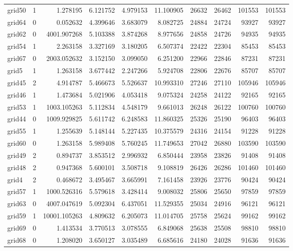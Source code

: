 \begin{longtable}{|l|r|r|r|r|r|r|r|r|r|}
grid50 & 1 & 1.278195 & 6.121752 & 4.979153 & 11.100905 & 26632 & 26462 & 101553 & 101553 \\
grid64 & 0 & 0.052632 & 4.399646 & 3.683079 & 8.082725 & 24884 & 24724 & 93927 & 93927 \\
grid62 & 0 & 4001.907268 & 5.103388 & 3.874268 & 8.977656 & 24858 & 24726 & 94935 & 94935 \\
grid54 & 1 & 2.263158 & 3.327169 & 3.180205 & 6.507374 & 22422 & 22304 & 85453 & 85453 \\
grid67 & 0 & 2003.052632 & 3.152150 & 3.099050 & 6.251200 & 22966 & 22846 & 87231 & 87231 \\
grid5 & 1 & 1.263158 & 3.677442 & 2.247266 & 5.924708 & 22806 & 22676 & 85707 & 85707 \\
grid45 & 2 & 4.914787 & 5.466673 & 5.526637 & 10.993310 & 27246 & 27110 & 105946 & 105946 \\
grid46 & 1 & 1.473684 & 5.021906 & 4.053418 & 9.075324 & 24258 & 24122 & 92165 & 92165 \\
grid53 & 1 & 1003.105263 & 5.112834 & 4.548179 & 9.661013 & 26248 & 26122 & 100760 & 100760 \\
grid44 & 0 & 1009.929825 & 5.611742 & 6.248583 & 11.860325 & 25326 & 25190 & 96403 & 96403 \\
grid55 & 1 & 1.255639 & 5.148144 & 5.227435 & 10.375579 & 24316 & 24154 & 91228 & 91228 \\
grid60 & 0 & 1.263158 & 5.989408 & 5.760245 & 11.749653 & 27042 & 26880 & 103590 & 103590 \\
grid49 & 2 & 0.894737 & 3.853512 & 2.996932 & 6.850444 & 23958 & 23826 & 91408 & 91408 \\
grid48 & 2 & 0.947368 & 5.600101 & 3.508718 & 9.108819 & 26426 & 26286 & 101460 & 101460 \\
grid4 & 2 & 0.468672 & 3.495467 & 3.665991 & 7.161458 & 23926 & 23776 & 90424 & 90424 \\
grid57 & 1 & 1000.526316 & 5.579618 & 3.428414 & 9.008032 & 25806 & 25650 & 97859 & 97859 \\
grid63 & 0 & 4007.047619 & 5.092304 & 6.437051 & 11.529355 & 25034 & 24916 & 96121 & 96121 \\
grid59 & 1 & 10001.105263 & 4.809632 & 6.205073 & 11.014705 & 25758 & 25624 & 99162 & 99162 \\
grid69 & 0 & 1.413534 & 3.770513 & 3.078555 & 6.849068 & 25638 & 25508 & 98810 & 98810 \\
grid68 & 0 & 1.208020 & 3.650127 & 3.035489 & 6.685616 & 24180 & 24028 & 91636 & 91636 \\

\end{longtable}
